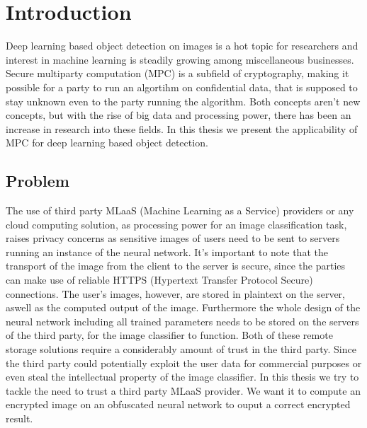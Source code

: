 
\chapter{Introduction}
Deep learning based object detection on images is a hot topic for researchers and interest in machine learning is steadily growing among miscellaneous businesses.
\newline
Secure multiparty computation (MPC) is a subfield of cryptography, making it possible for a party to run an algortihm on confidential data, that is supposed to stay unknown even to the party running the algorithm.
\newline
Both concepts aren't new concepts, but with the rise of big data and processing power, there has been an increase in research into these fields.
\newline
In this thesis we present the applicability of MPC for deep learning based object detection.

\section{Problem}
The use of third party MLaaS (Machine Learning as a Service) providers or any cloud computing solution, as processing power for an image classification task, raises privacy concerns as sensitive images of users need to be sent to servers running an instance of the neural network. It's important to note that the transport of the image from the client to the server is secure, since the parties can make use of reliable HTTPS (Hypertext Transfer Protocol Secure) connections. The user's images, however, are stored in plaintext on the server, aswell as the computed output of the image. Furthermore the whole design of the neural network including all trained parameters needs to be stored on the servers of the third party, for the image classifier to function. Both of these remote storage solutions require a considerably amount of trust in the third party. Since the third party could potentially exploit the user data for commercial purposes or even steal the intellectual property of the image classifier. In this thesis we try to tackle the need to trust a third party MLaaS provider. We want it to compute an encrypted image on an obfuscated neural network to ouput a correct encrypted result.


